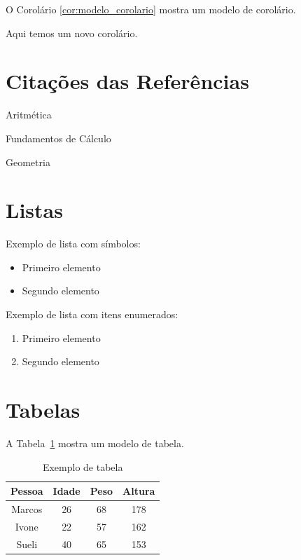 \documentclass[12pt,a4paper,oneside]{abntex2}
\begin{document}
O Corolário \ref{cor:modelo_corolario} mostra um modelo de corolário.

\begin{corolario}
Aqui temos um novo corolário.
\label{cor:modelo_corolario}
\end{corolario}


\section{Citações das Referências}

Aritmética~\cite{hefez2009sociedade}

Fundamentos de Cálculo~\cite{neto2015fundamentos}

Geometria~\cite{muniz2013geometria}


\section{Listas}

Exemplo de lista com símbolos:

\begin{itemize}
    \item Primeiro elemento
    \item Segundo elemento
\end{itemize}

Exemplo de lista com itens enumerados:

\begin{enumerate}
    \item Primeiro elemento
    \item Segundo elemento
\end{enumerate}


\section{Tabelas}

A Tabela~\ref{tab:modelo_tabela} mostra um modelo de tabela.

\begin{table}[htb]
    \caption{Exemplo de tabela}
    \label{tab:modelo_tabela}
    \centering
    \begin{tabular}{c|c|c|c}
	    \hline
	    \textbf{Pessoa} & \textbf{Idade} & \textbf{Peso} & \textbf{Altura} \\ \hline
	    Marcos & 26    & 68   & 178    \\ \hline
	    Ivone  & 22    & 57   & 162    \\ \hline
	    Sueli  & 40    & 65   & 153    \\ \hline
    \end{tabular}
\end{table}
\end{document}
